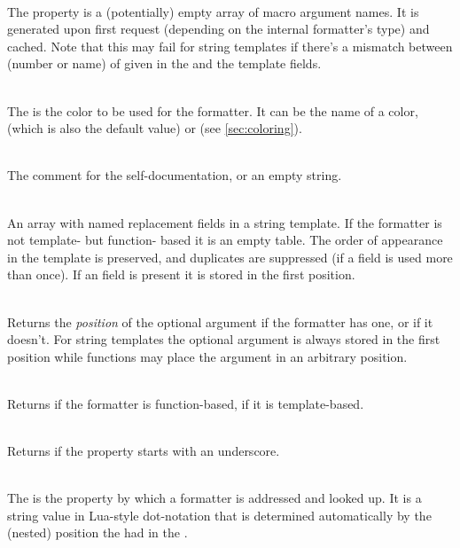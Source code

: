 \documentclass[12pt]{scrartcl}
\begin{document}
\begin{itemize*}
\item {}\\
The  property is a (potentially) empty array of macro argument
names.  It is generated upon first request (depending on the internal
formatter's type) and cached.  Note that this may fail for string templates if
there's a mismatch between (number or name) of  given in the
 and the template fields.

\item {}\\
The  is the color to be used for the formatter. It can be the
name of a color,  (which is also the default value) or
 (see  \vref{sec:coloring}).

\item {}\\
The comment for the self-documentation, or an empty string.

\item {}\\
An array with named replacement fields in a string template.  If the formatter
is not template- but function- based it is an empty table.  The order of
appearance in the template is preserved, and duplicates are suppressed (if a
field is used more than once).  If an  field is present it
is stored in the first position.

\item {}\\
Returns the \emph{position} of the optional argument if the formatter has one,
or  if it doesn't.  For string templates the optional argument is
always stored in the first position while functions may place the
 argument in an arbitrary position.

\item {}\\
Returns  if the formatter is function-based,  if it
is template-based.

\item {}\\
Returns  if the  property starts with an underscore.

\item {}\\
The  is the property by which a formatter is addressed and looked
up.  It is a string value in Lua-style dot-notation that is determined
automatically by the (nested) position the  had in the
.


\end{itemize*}
\end{document}
